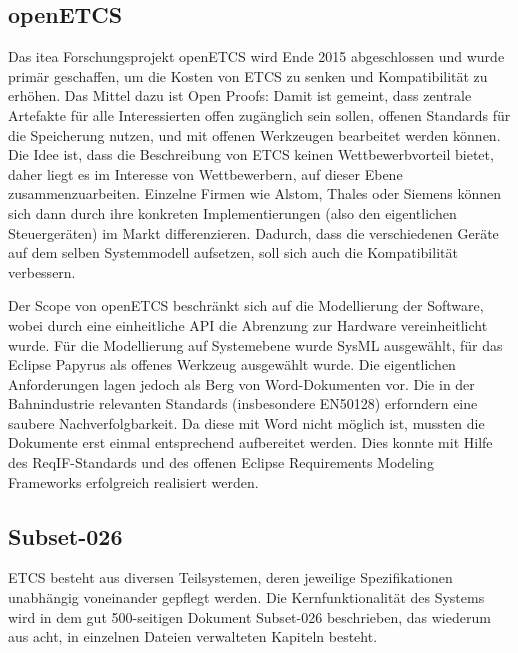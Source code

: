 \documentclass[twoside]{article}
\begin{document}
\begin{multicols}{2}
\subsection{openETCS}
\label{sec:openetcs}

Das itea Forschungsprojekt \glqq{}openETCS\grqq{} wird Ende 2015 abgeschlossen \cite{itea-openetcs} und wurde primär geschaffen, um die Kosten von ETCS zu senken und Kompatibilität zu erhöhen.  Das Mittel dazu ist \glqq{}Open Proofs\grqq{}:  Damit ist gemeint, dass zentrale Artefakte für alle Interessierten offen zugänglich sein sollen, offenen Standards für die Speicherung nutzen, und mit offenen Werkzeugen bearbeitet werden können.  Die Idee ist, dass die Beschreibung von ETCS keinen Wettbewerbvorteil bietet, daher liegt es im Interesse von Wettbewerbern, auf dieser Ebene zusammenzuarbeiten.  Einzelne Firmen wie Alstom, Thales oder Siemens können sich dann durch ihre konkreten Implementierungen (also den eigentlichen Steuergeräten) im Markt differenzieren.  Dadurch, dass die verschiedenen Geräte auf dem selben Systemmodell aufsetzen, soll sich auch die Kompatibilität verbessern.

Der Scope von openETCS beschränkt sich auf die Modellierung der Software, wobei durch eine einheitliche API die Abrenzung zur Hardware vereinheitlicht wurde.  Für die Modellierung auf Systemebene wurde SysML ausgewählt, für das Eclipse Papyrus als offenes Werkzeug ausgewählt wurde.  Die eigentlichen Anforderungen lagen jedoch als Berg von Word-Dokumenten vor.  Die in der Bahnindustrie relevanten Standards (insbesondere EN50128) erforndern eine saubere Nachverfolgbarkeit.  Da diese mit Word nicht möglich ist, mussten die Dokumente erst einmal entsprechend aufbereitet werden. Dies konnte mit Hilfe des ReqIF-Standards und des offenen Eclipse Requirements Modeling Frameworks erfolgreich realisiert werden.

\subsection{Subset-026}
\label{sec:subset-26}

ETCS besteht aus diversen Teilsystemen, deren jeweilige Spezifikationen unabhängig voneinander gepflegt werden. Die Kernfunktionalität des Systems wird in dem gut 500-seitigen Dokument \glqq{}Subset-026\grqq{} beschrieben, das wiederum aus acht, in einzelnen Dateien verwalteten Kapiteln besteht.


\end{multicols}
\end{document}
